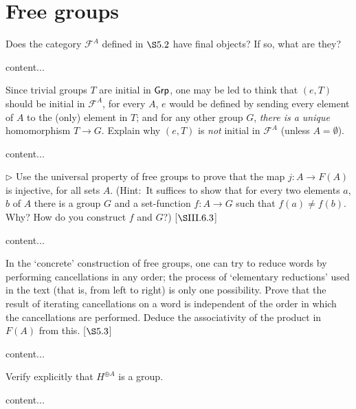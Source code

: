 \section{Free groups}
\extitle
\begin{exercise}
	Does the category $\mathscr{F}^A$ defined in $\S 5.2$ have final objects? If so, what are they?
\end{exercise}
\begin{solution}
	content...
\end{solution}

\begin{exercise}
	Since trivial groups $T$ are initial in $\textsf{Grp}$, one may be led to think that $(e,T)$ should be initial in $\mathscr{F}^A$, for every $A$, $e$ would be defined by sending every element of $A$ to the (only) element in $T$; and for any other group $G$, \emph{there is a unique} homomorphism $T \to G$. Explain why $(e,T)$ is \emph{not} initial in $\mathscr{F}^A$ (unless $A =\emptyset$).
\end{exercise}
\begin{solution}
	content...
\end{solution}

\begin{exercise}
	$\triangleright$ Use the universal property of free groups to prove that the map $j\colon A \to F(A)$ is injective, for all sets $A$. (Hint$\colon$ It suffices to show that for every two elements $a$, $b$ of $A$ there is a group $G$ and a set-function $f\colon A \to G$ such that $f(a) \neq f(b)$. Why? How do you construct $f$ and $G$?) [$\S\RNo{3}.6.3$]
\end{exercise}
\begin{solution}
	content...
\end{solution}

\begin{exercise}
	In the `concrete' construction of free groups, one can try to reduce words by performing cancellations in any order; the process of `elementary reductions' used in the text (that is, from left to right) is only one possibility. Prove that the result of iterating cancellations on a word is independent of the order in which the cancellations are performed. Deduce the associativity of the product in $F(A)$ from this. [$\S5.3$]
\end{exercise}
\begin{solution}
	content...
\end{solution}

\begin{exercise}
	Verify explicitly that $H^{\oplus A}$ is a group. 
\end{exercise}
\begin{solution}
	content...
\end{solution}

